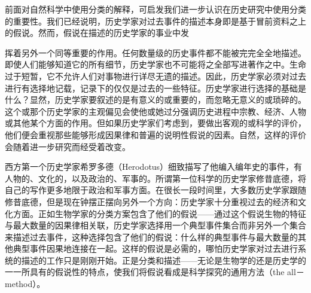 前面对自然科学中使用分类的解释，可启发我们进一步认识在历史研究中使用分类的重要性。我们已经说明，历史学家对过去事件的描述本身即是基于冒前资料之上的假说。然而，假说在描述的历史学家的事业中发

挥着另外一个同等重要的作用。任何数量级的历史事件都不能被完完全全地描述。即使人们能够知道它的所有细节，历史学家也不可能将之全部写进著作之中。生命过于短暂，它不允许人们对事物进行详尽无遗的描述。因此，历史学家必须对过去进行有选择地记载，记录下的仅仅是过去的一些特征。历史学家进行选择的基础是什么？显然，历史学家要叙述的是有意义的或重要的，而忽略无意义的或琐碎的。这个或那个历史学家的主观偏见会使他或她过分强调历史进程中宗教、经济、人物或其他某个方面的作用。但如果历史学家们考虑到，要做出客观的或科学的评价，他们便会重视那些能够形成因果律和普遍的说明性假说的因素。自然，这样的评价会随着进一步研究而经受着改变。

西方第一个历史学家希罗多德（Herodotus）细致描写了他编入编年史的事件，有人物的、文化的，以及政治的、军事的。所谓第一位科学的历史学家修昔底德，将自己的写作更多地限于政治和军事方面。在很长一段时间里，大多数历史学家跟随修昔底德，但是现在钟摆正摆向另外一个方向：历史学家十分重视过去的经济和文化方面。正如生物学家的分类方案包含了他们的假说——通过这个假说生物的特征与最大数量的因果律相关联，历史学家选择用一个典型事件集合而非另外一个集合来描述过去事件，这种选择包含了他们的假说：什么样的典型事件与最大数量的其他典型事件因果地连接在一起。这样的假说是必需的，哪怕历史学家对过去进行系统的描述的工作只是刚刚开始。正是分类和描述——无论是生物学的还是历史学的一一所具有的假说性的特点，使我们将假说看成是科学探究的通用方法（the all－method）。

